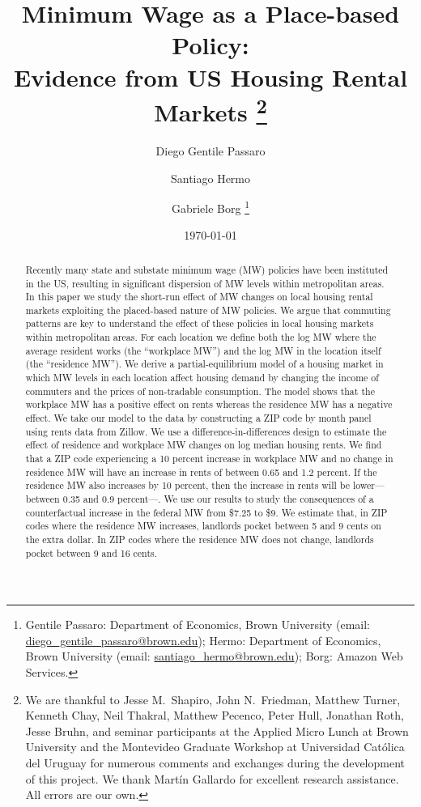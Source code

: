 \documentclass{article}
\title{ Minimum Wage as a Place-based Policy: \\
        Evidence from US Housing Rental Markets%
        \thanks{We are thankful to Jesse M.\ Shapiro, John N.\ Friedman, 
        Matthew Turner, Kenneth Chay, Neil Thakral, Matthew Pecenco, Peter Hull,
        Jonathan Roth, Jesse Bruhn, 
        and seminar participants at the Applied Micro Lunch at Brown
        University and the Montevideo Graduate Workshop at Universidad Católica 
        del Uruguay
        for numerous comments and exchanges during the development of 
        this project.
        We thank Martín Gallardo for excellent research assistance.
        All errors are our own.}}
\author{Diego Gentile Passaro \and Santiago Hermo \and Gabriele Borg
        \footnote{Gentile Passaro: Department of Economics, Brown University 
        (email: \url{diego_gentile_passaro@brown.edu}); 
        Hermo: Department of Economics, Brown University 
        (email: \url{santiago_hermo@brown.edu});
        Borg: Amazon Web Services.}}
\date{\today}
\begin{document}
\maketitle

\begin{abstract}
    \noindent
    Recently many state and substate minimum wage (MW) policies have been 
    instituted in the US, resulting in significant dispersion of MW levels 
    within metropolitan areas.
    In this paper we study the short-run effect of MW changes on local housing 
    rental markets exploiting the placed-based nature of MW policies.
    We argue that commuting patterns are key to understand the effect of these
    policies in local housing markets within metropolitan areas.
    For each location we define both
    the log MW where the average resident works (the ``workplace MW'')
    and the log MW in the location itself (the ``residence MW'').
    We derive a partial-equilibrium model of a housing market
    in which MW levels in each location affect housing demand by 
    changing the income of commuters and the prices of non-tradable consumption. 
    The model shows that the workplace MW has a positive effect on rents 
    whereas the residence MW has a negative effect.
    We take our model to the data by constructing a ZIP code by month panel 
    using rents data from Zillow.
    We use a difference-in-differences design to estimate the effect of 
    residence and workplace MW changes on log median housing rents.
    We find that a ZIP code experiencing a 10 percent increase in workplace MW
    and no change in residence MW will have an increase in rents of between 
    0.65 and 1.2 percent.
    If the residence MW also increases by 10 percent, then the increase in 
    rents will be lower---between 0.35 and 0.9 percent---.
    We use our results to study the consequences of a counterfactual increase in 
    the federal MW from \$7.25 to \$9.
    We estimate that, in ZIP codes where the residence MW increases, landlords 
    pocket between 5 and 9 cents on the extra dollar.
    In ZIP codes where the residence MW does not change, landlords pocket 
    between 9 and 16 cents.
\end{abstract}

\vspace{5mm}
\end{document}
